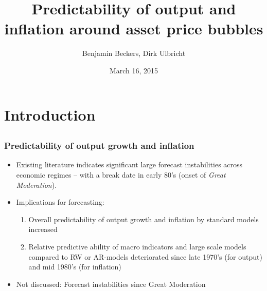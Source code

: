 \documentclass [handout] {beamer} %
\author[Benjamin Beckers]{Benjamin Beckers, Dirk Ulbricht}
\institute{DIW Berlin, Macroeconomics}
\date{March 16, 2015}
\title{Predictability of output and inflation around asset price bubbles}
\begin{document}


\begin{frame}[plain] 
	\titlepage
	\thispagestyle{empty}
\end{frame}

\section{Introduction}

\subsection{}

\begin{frame}
\frametitle{Predictability of output growth and inflation}
	\begin{itemize}
	\item Existing literature indicates significant large forecast instabilities across economic regimes -- with a break date in early 80's (onset of \emph{Great Moderation}).
	\item Implications for forecasting:
	\begin{enumerate}
		\item Overall predictability of output growth and inflation by standard models increased \citep{dagostino06} %
		\item Relative predictive ability of macro indicators and large scale models compared to RW or AR-models deteriorated since late 1970's (for output) and mid 1980's (for inflation) \citep{rossi10}
	\end{enumerate}
	\item Not discussed: Forecast instabilities since Great Moderation
	\end{itemize}
\end{frame}
\end{document}
